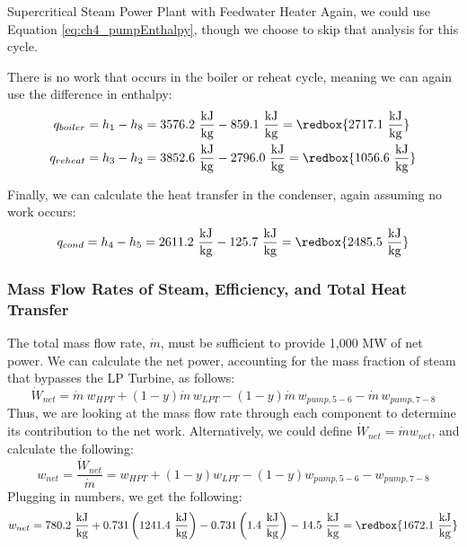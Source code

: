 \begin{example}[label=ex:ch4FeedwaterHeater]{Supercritical Steam Power Plant with Feedwater Heater}
  Again, we could use Equation \ref{eq:ch4_pumpEnthalpy}, though we choose to skip that analysis for this cycle.
  
  There is no work that occurs in the boiler or reheat cycle, meaning we can again use the difference in enthalpy:
  \begin{align*}
    q_{boiler} &= h_1 - h_8 = 3576.2\ \frac{\rm kJ}{\rm kg} - 859.1\ \frac{\rm kJ}{\rm kg} = \redbox{2717.1\ \frac{\rm kJ}{\rm kg}} \\
    q_{reheat} &= h_3 - h_2 = 3852.6\ \frac{\rm kJ}{\rm kg} - 2796.0\ \frac{\rm kJ}{\rm kg} = \redbox{1056.6\ \frac{\rm kJ}{\rm kg}}
  \end{align*}

  Finally, we can calculate the heat transfer in the condenser, again assuming no work occurs:
   \begin{equation*}
    q_{cond} = h_4 - h_5 = 2611.2\ \frac{\rm kJ}{\rm kg} - 125.7\ \frac{\rm kJ}{\rm kg} = \redbox{2485.5\ \frac{\rm kJ}{\rm kg}}
   \end{equation*}

   \subsubsection*{Mass Flow Rates of Steam, Efficiency, and Total Heat Transfer}
   The total mass flow rate, $\dot{m}$, must be sufficient to provide 1,000 MW of net power.  We can calculate the net power, accounting for the mass fraction of steam that bypasses the LP Turbine, as follows:
   \begin{equation*}
     \dot{W}_{net} = \dot{m}\:w_{HPT} + (1-y)\dot{m}\,w_{LPT} - (1-y)\dot{m}\,w_{pump, 5-6} - \dot{m}\,w_{pump, 7-8}
   \end{equation*}
   Thus, we are looking at the mass flow rate through each component to determine its contribution to the net work.  Alternatively, we could define $\dot{W}_{net} = \dot{m} w_{net}$, and calculate the following:
   \begin{equation*}
     w_{net} = \frac{\dot{W}_{net}}{\dot{m}}=w_{HPT} + (1-y)w_{LPT} - (1-y)w_{pump, 5-6} - w_{pump, 7-8}
   \end{equation*}
   Plugging in numbers, we get the following:
   \begin{equation*}
      w_{net} = 780.2\ \frac{\rm kJ}{\rm kg} + 0.731 \left(1241.4\ \frac{\rm kJ}{\rm kg}\right) - 0.731 \left(1.4\ \frac{\rm kJ}{\rm kg}\right) - 14.5\ \frac{\rm kJ}{\rm kg} = \redbox{1672.1\ \frac{\rm kJ}{\rm kg}}
   \end{equation*}


\end{example}
